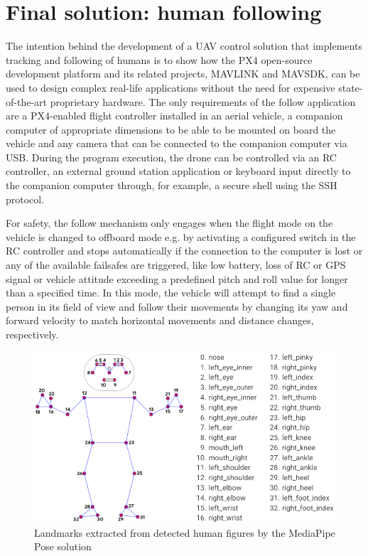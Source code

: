 \section{Final solution: human following}
\label{sec:follow}

The intention behind the development of a UAV control solution that implements tracking and following of humans is to show how the PX4 open-source development platform and its related projects, MAVLINK and MAVSDK, can be used to design complex real-life applications without the need for expensive state-of-the-art proprietary hardware.
The only requirements of the follow application are a PX4-enabled flight controller installed in an aerial vehicle, a companion computer of appropriate dimensions to be able to be mounted on board the vehicle and any camera that can be connected to the companion computer via USB.
During the program execution, the drone can be controlled via an RC controller, an external ground station application or keyboard input directly to the companion computer through, for example, a secure shell using the SSH protocol.

For safety, the follow mechanism only engages when the flight mode on the vehicle is changed to offboard mode e.g. by activating a configured switch in the RC controller and stops automatically if the connection to the computer is lost or any of the available failsafes are triggered, like low battery, loss of RC or GPS signal or vehicle attitude exceeding a predefined pitch and roll value for longer than a specified time.
In this mode, the vehicle will attempt to find a single person in its field of view and follow their movements by changing its yaw and forward velocity to match horizontal movements and distance changes, respectively.

\begin{figure}
  \centering
  \includegraphics[width=\textwidth, keepaspectratio]{img/pose-landmarks.png}
  \caption{Landmarks extracted from detected human figures by the MediaPipe Pose solution}
  \label{fig:pose-landmarks}
\end{figure}

